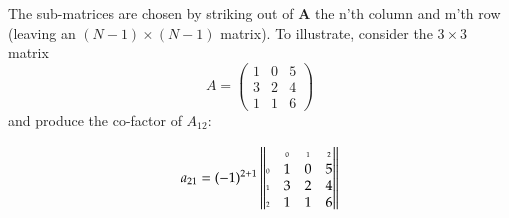 The sub-matrices are chosen by striking out of \textbf{A} the n'th column
and m'th row (leaving an $(N-1)\times(N-1)$ matrix). To illustrate,
consider the $3 \times 3$ matrix
\begin{equation}
    \label{eq:09_11}
    A = 
    \begin{pmatrix}
        1 & 0 & 5\\ 
        3 & 2 & 4\\ 
        1 & 1 & 6
    \end{pmatrix}
\end{equation}
and produce the co-factor of $A_{12}$:

\begin{samepage}
    \nopagebreak
    \vspace{1cm} %
    \nopagebreak
    \begin{equation}
        \label{eq:09_12}
        a_{21}=(-1)^{2+1}
        \begin{Vmatrix}
            &\scriptscriptstyle  0 \tikz[overlay,remember picture] \node (EndC){}; & \scriptscriptstyle 1 & \scriptscriptstyle 2 \\
            \scriptscriptstyle  0 & 1 & \tikz[overlay,remember picture] \node (StartA){};0 & 5 \\
            \scriptscriptstyle  1 & \tikz[overlay,remember picture] \node (StartB){};3 & 2 & \tikz[overlay,remember picture] \node (EndB){}; 4 \\
            \scriptscriptstyle \tikz[overlay,remember picture] \node (EndD){}; 2 & 1 & \tikz[overlay,remember picture] \node (EndA){};1 & 6 
        \end{Vmatrix}
    \end{equation}
    \nopagebreak
    \vspace{1cm} %
\end{samepage}

